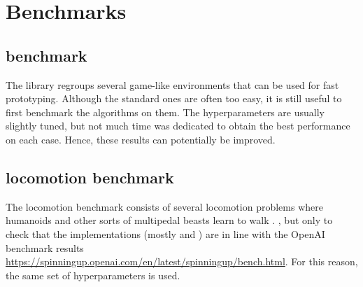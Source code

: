 \chapter{Benchmarks}

\section{\gym benchmark}

The \gym library regroups several game-like environments that can be used for fast prototyping. Although the standard ones are often too easy, it is still useful to first benchmark the algorithms on them. The hyperparameters are usually slightly tuned, but not much time was dedicated to obtain the best performance on each case. Hence, these results can potentially be improved.



\section{\mujoco locomotion benchmark}

The \mujoco locomotion benchmark consists of several locomotion problems where humanoids and other sorts of multipedal beasts learn to walk \cite{mujoco}. , but only to check that the implementations (mostly \tdt and \sac) are in line with the OpenAI benchmark results \url{https://spinningup.openai.com/en/latest/spinningup/bench.html}. For this reason, the same set of hyperparameters is used.

